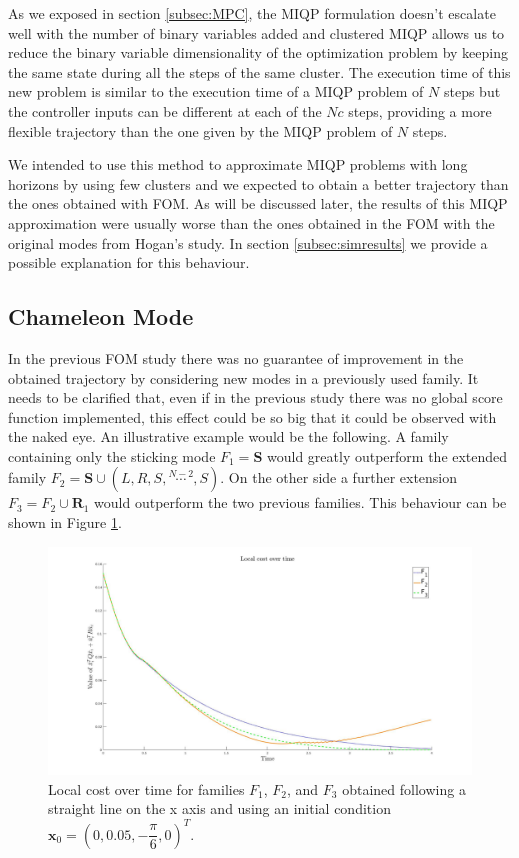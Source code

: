 \documentclass[12,twoside]{TFG-GM}
\theoremstyle{definition}
\theoremstyle{remark}
\begin{document}
As we exposed in section \ref{subsec:MPC}, the MIQP formulation doesn't escalate well with the number of binary variables added and clustered MIQP allows us to reduce the binary variable dimensionality of the optimization problem by keeping the same state during all the steps of the same cluster. The execution time of this new problem is similar to the execution time of a MIQP problem of $N$ steps but the controller inputs can be different at each of the $N c$ steps, providing a more flexible trajectory than the one given by the MIQP problem of $N$ steps.

We intended to use this method to approximate MIQP problems with long horizons by using few clusters and we expected to obtain a better trajectory than the ones obtained with FOM. As will be discussed later, the results of this MIQP approximation were usually worse than the ones obtained in the FOM with the original modes from Hogan's study. In section \ref{subsec:simresults} we provide a possible explanation for this behaviour.

\subsection{Chameleon Mode}
\label{subsec:chameleon}

In the previous FOM study there was no guarantee of improvement in the obtained trajectory by considering new modes in a previously used family. It needs to be clarified that, even if in the previous study there was no global score function implemented, this effect could be so big that it could be observed with the naked eye. An illustrative example would be the following. A family containing only the sticking mode $F_1 = \textbf{S}$ would greatly outperform the extended family $F_2 = \textbf{S} \cup (L, R, S, \stackrel{N-2}{\cdots}, S)$. On the other side a further extension $F_3 = F_2 \cup \textbf{R}_1$ would outperform the two previous families. This behaviour can be shown in Figure \ref{fig:non_chameleon}.

\begin{figure}[htb!]
\begin{center}
\includegraphics[width=16cm]{non_chameleon.jpg}
\end{center}
\caption{\label{fig:non_chameleon} \small Local cost over time for families $F_1$, $F_2$, and $F_3$ obtained following a straight line on the x axis and using an initial condition $\textbf{x}_0 = (0, 0.05, - \dfrac{\pi}{6}, 0)^T$.}
\end{figure}
\end{document}
